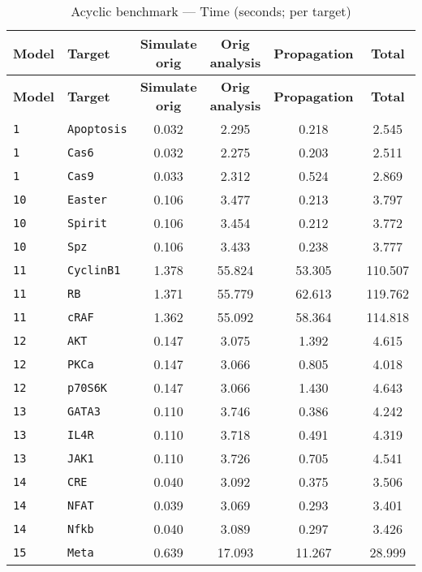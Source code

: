 \clearpage
\begingroup
\small
\setlength{\tabcolsep}{4pt}
\renewcommand{\arraystretch}{1.0}
\begin{longtable}{llcccc}
\caption{Acyclic benchmark --- Time (seconds; per target)}\label{tab:acyclic\_time} \\
\toprule
\textbf{Model} & \textbf{Target} & \textbf{Simulate orig} & \textbf{Orig analysis} & \textbf{Propagation} & \textbf{Total} \\
\midrule
\endfirsthead
\toprule
\textbf{Model} & \textbf{Target} & \textbf{Simulate orig} & \textbf{Orig analysis} & \textbf{Propagation} & \textbf{Total} \\
\midrule
\endhead
\midrule
\endfoot
\bottomrule
\endlastfoot
\texttt{1} & \texttt{Apoptosis} & 0.032 & 2.295 & 0.218 & 2.545 \\
\texttt{1} & \texttt{Cas6} & 0.032 & 2.275 & 0.203 & 2.511 \\
\texttt{1} & \texttt{Cas9} & 0.033 & 2.312 & 0.524 & 2.869 \\
\texttt{10} & \texttt{Easter} & 0.106 & 3.477 & 0.213 & 3.797 \\
\texttt{10} & \texttt{Spirit} & 0.106 & 3.454 & 0.212 & 3.772 \\
\texttt{10} & \texttt{Spz} & 0.106 & 3.433 & 0.238 & 3.777 \\
\texttt{11} & \texttt{CyclinB1} & 1.378 & 55.824 & 53.305 & 110.507 \\
\texttt{11} & \texttt{RB} & 1.371 & 55.779 & 62.613 & 119.762 \\
\texttt{11} & \texttt{cRAF} & 1.362 & 55.092 & 58.364 & 114.818 \\
\texttt{12} & \texttt{AKT} & 0.147 & 3.075 & 1.392 & 4.615 \\
\texttt{12} & \texttt{PKCa} & 0.147 & 3.066 & 0.805 & 4.018 \\
\texttt{12} & \texttt{p70S6K} & 0.147 & 3.066 & 1.430 & 4.643 \\
\texttt{13} & \texttt{GATA3} & 0.110 & 3.746 & 0.386 & 4.242 \\
\texttt{13} & \texttt{IL4R} & 0.110 & 3.718 & 0.491 & 4.319 \\
\texttt{13} & \texttt{JAK1} & 0.110 & 3.726 & 0.705 & 4.541 \\
\texttt{14} & \texttt{CRE} & 0.040 & 3.092 & 0.375 & 3.506 \\
\texttt{14} & \texttt{NFAT} & 0.039 & 3.069 & 0.293 & 3.401 \\
\texttt{14} & \texttt{Nfkb} & 0.040 & 3.089 & 0.297 & 3.426 \\
\texttt{15} & \texttt{Meta} & 0.639 & 17.093 & 11.267 & 28.999 \\

\end{longtable}
